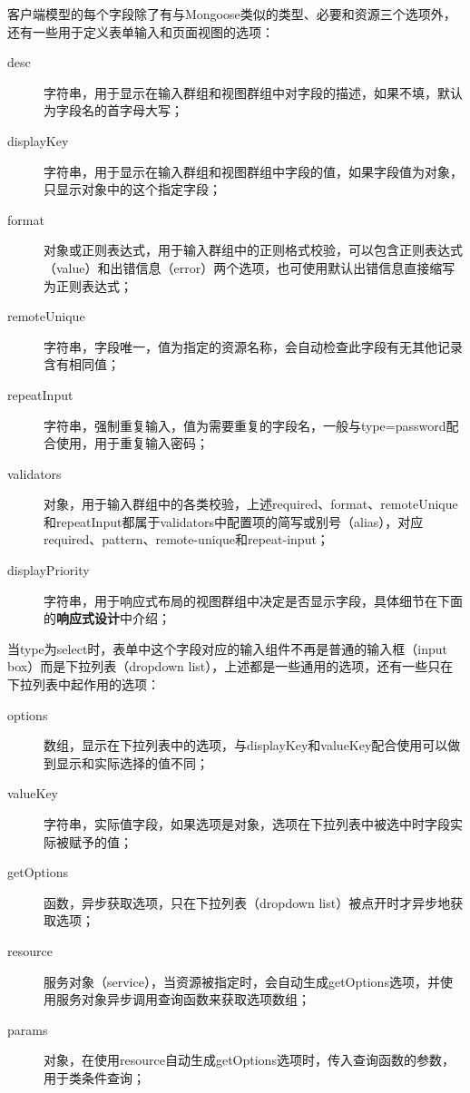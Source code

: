 客户端模型的每个字段除了有与Mongoose类似的类型、必要和资源三个选项外，还有一些用于定义表单输入和页面视图的选项：
\begin{description}
  \item[desc] 字符串，用于显示在输入群组和视图群组中对字段的描述，如果不填，默认为字段名的首字母大写；
  \item[displayKey] 字符串，用于显示在输入群组和视图群组中字段的值，如果字段值为对象，只显示对象中的这个指定字段；
  \item[format] 对象或正则表达式，用于输入群组中的正则格式校验，可以包含正则表达式（value）和出错信息（error）两个选项，也可使用默认出错信息直接缩写为正则表达式；
  \item[remoteUnique] 字符串，字段唯一，值为指定的资源名称，会自动检查此字段有无其他记录含有相同值；
  \item[repeatInput] 字符串，强制重复输入，值为需要重复的字段名，一般与type=password配合使用，用于重复输入密码；
  \item[validators] 对象，用于输入群组中的各类校验，上述required、format、remoteUnique和repeatInput都属于validators中配置项的简写或别号（alias），对应required、pattern、remote-unique和repeat-input；
  \item[displayPriority] 字符串，用于响应式布局的视图群组中决定是否显示字段，具体细节在下面的\textbf{响应式设计}中介绍；
\end{description}

当type为select时，表单中这个字段对应的输入组件不再是普通的输入框（input box）而是下拉列表（dropdown list），上述都是一些通用的选项，还有一些只在下拉列表中起作用的选项：
\begin{description}
  \item[options] 数组，显示在下拉列表中的选项，与displayKey和valueKey配合使用可以做到显示和实际选择的值不同；
  \item[valueKey] 字符串，实际值字段，如果选项是对象，选项在下拉列表中被选中时字段实际被赋予的值；
  \item[getOptions] 函数，异步获取选项，只在下拉列表（dropdown list）被点开时才异步地获取选项；
  \item[resource] 服务对象（service），当资源被指定时，会自动生成getOptions选项，并使用服务对象异步调用查询函数来获取选项数组；
  \item[params] 对象，在使用resource自动生成getOptions选项时，传入查询函数的参数，用于类条件查询；
\end{description}

